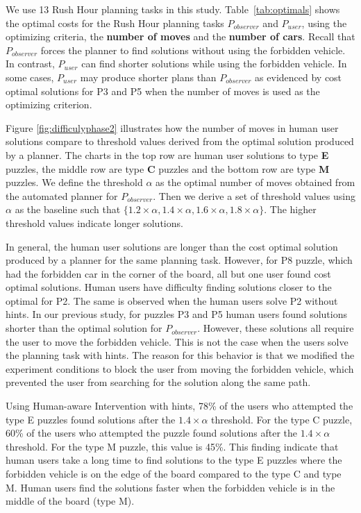 We use 13 Rush Hour planning tasks in this study.
Table~\ref{tab:optimals} shows the optimal costs for the Rush Hour planning tasks $P_{observer}$ and $P_{user}$, using the optimizing criteria, the \textbf{number of moves} and the \textbf{number of cars}.
Recall that $P_{observer}$ forces the planner to find solutions without using the forbidden vehicle.
In contrast, $P_{user}$ can find shorter solutions while using the forbidden vehicle.
In some cases, $P_{user}$ may produce shorter plans than $P_{observer}$ as evidenced by cost optimal solutions for P3 and P5 when the number of moves is used as the optimizing criterion.

Figure \ref{fig:difficulyphase2} illustrates how the number of moves in human user solutions compare to threshold values derived from the optimal solution produced by a planner.
The charts in the top row are human user solutions to type \textbf{E} puzzles, the middle row are type \textbf{C} puzzles and the bottom row are type \textbf{M} puzzles.
We define the threshold $\alpha$ as the optimal number of moves obtained from the automated planner for $P_{observer}$.
Then we derive a set of threshold values using $\alpha$ as the baseline such that $\lbrace 1.2\times \alpha, 1.4\times \alpha, 1.6\times \alpha, 1.8\times \alpha \rbrace$.
The higher threshold values indicate longer solutions.

In general, the human user solutions are longer than the cost optimal solution produced by a planner for the same planning task.
However, for P8 puzzle, which had the forbidden car in the corner of the board, all but one user found cost optimal solutions.
Human users have difficulty finding solutions closer to the optimal for P2.
The same is observed when the human users solve P2 without hints. 
In our previous study, for puzzles P3 and P5 human users found solutions shorter than the optimal solution for $P_{observer}$.
However, these solutions all require the user to move the forbidden vehicle.
This is not the case when the users solve the planning task with hints.
The reason for this behavior is that we modified the experiment conditions to block the user from moving the forbidden vehicle, which prevented the user from searching for the solution along the same path.

Using Human-aware Intervention with hints, 78\% of the users who attempted the type E puzzles found solutions after the $1.4\times\alpha$ threshold.
For the type C puzzle, 60\% of the users who attempted the puzzle found solutions after the $1.4\times\alpha$ threshold.
For the type M puzzle, this value is 45\%.
This finding indicate that human users take a long time to find solutions to the type E puzzles where the forbidden vehicle is on the edge of the board compared to the type C and type M.
Human users find the solutions faster when the forbidden vehicle is in the middle of the board (type M).


